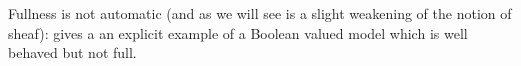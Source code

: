 \documentclass[11pt]{amsart}
\newcommand{\LL}{\mathcal{L}}
\newcommand{\Id}{\textrm{Id}}
\newcommand{\malg}{\bool{MALG}}
\newcommand{\Null}{\mathrm{Null}}
\newcommand{\Z}{\mathbb{Z}}
\theoremstyle{plain}
\theoremstyle{definition}
\newtheorem{example}[theorem]{Example}
\theoremstyle{plain}
\theoremstyle{remark}
\newcommand{\bool}[1]{\mathsf{#1}}
\newcommand{\analytic}[1]{C^\omega(#1)}
\newcommand{\qp}[1]{\left[ #1 \right]}
\newcommand{\Qp}[1]{\left\llbracket #1 \right\rrbracket}
\newcommand{\bp}[1]{\left\lbrace #1 \right\rbrace}
\newcommand{\0}{\mathsf{0}}
\renewcommand{\1}{\mathsf{1}}
\renewcommand{\2}{\mathsf{2}}
\theoremstyle{definition}
\newcommand{\R}{\mathbb{R}} %
\begin{document}
Fullness is not automatic (and as we will see is a slight weakening of the notion of sheaf):
\cite[Example 6.3.5]{viale-bookonforcing}
gives a an explicit example of a Boolean valued model which is well behaved but not full. 
\end{document}
